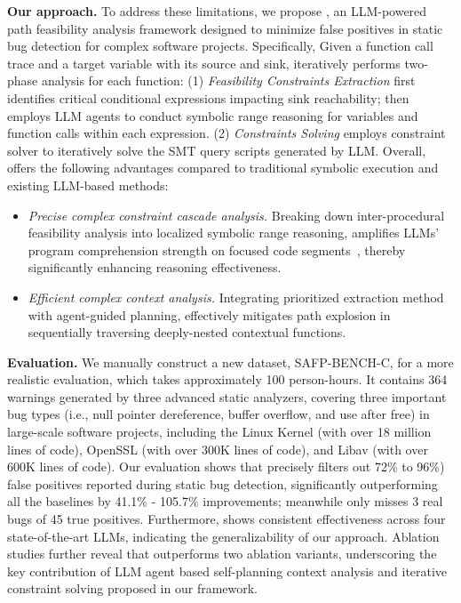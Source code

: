 \textbf{Our approach. }
To address these limitations, we propose \app{}, an LLM-powered path feasibility analysis framework designed to minimize false positives in static bug detection for complex software projects. 
Specifically, Given a function call trace and a target variable with its source and sink, \app{} iteratively performs two-phase analysis for each function: (1) \textit{Feasibility Constraints Extraction} first identifies critical conditional expressions impacting sink reachability; then employs LLM agents to conduct symbolic range reasoning for variables and function calls within each expression. (2) \textit{Constraints Solving} employs constraint solver to iteratively solve the SMT query scripts generated by LLM. 
Overall, \app{} offers the following advantages compared to traditional symbolic execution and existing LLM-based methods: 

\begin{itemize}[itemsep=2pt,topsep=0pt,parsep=0pt]
\item \textit{Precise complex constraint cascade analysis.} Breaking down inter-procedural feasibility analysis into localized symbolic range reasoning, \app{} amplifies LLMs' program comprehension strength on focused code segments~\cite{li2023loogle}, thereby significantly enhancing reasoning effectiveness.

\item \textit{Efficient complex context analysis.} Integrating prioritized \constraint{} extraction method with agent-guided planning, \app{} effectively mitigates path explosion in  sequentially traversing deeply-nested contextual functions.
\end{itemize}


\textbf{Evaluation.}
We manually construct a new dataset, SAFP-BENCH-C, for a more realistic evaluation, which takes approximately 100 person-hours.  It contains 364 warnings generated by three advanced static analyzers, covering three important bug types (i.e., null pointer dereference, buffer overflow, and use after free) in large-scale software projects, including the Linux Kernel (with over 18 million lines of code), OpenSSL (with over 300K lines of code), and Libav (with over 600K lines of code). Our evaluation shows that \app{} precisely filters out 72\% to 96\%) false positives reported during static bug detection, significantly outperforming all the baselines by 41.1\% - 105.7\% improvements; meanwhile \app{} only misses 3 real bugs of 45 true positives. 
Furthermore, \app{} shows consistent effectiveness across four state-of-the-art LLMs, indicating the generalizability of our approach. Ablation studies further reveal that \app{} outperforms two ablation variants, underscoring the key contribution of LLM agent based self-planning context analysis and iterative constraint solving proposed in our framework.


